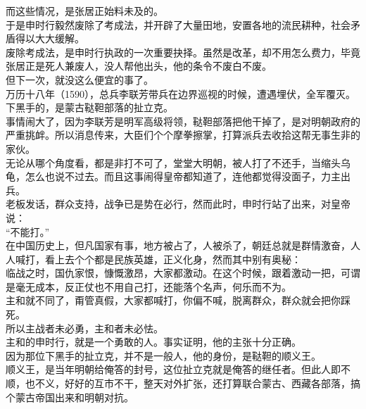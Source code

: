 \begin{multicols}{\theparacolNo}
而这些情况，是张居正始料未及的。\\

于是申时行毅然废除了考成法，并开辟了大量田地，安置各地的流民耕种，社会矛盾得以大大缓解。\\

废除考成法，是申时行执政的一次重要抉择。虽然是改革，却不用怎么费力，毕竟张居正是死人兼废人，没人帮他出头，他的条令不废白不废。\\

但下一次，就没这么便宜的事了。\\

万历十八年（1590），总兵李联芳带兵在边界巡视的时候，遭遇埋伏，全军覆灭。下黑手的，是蒙古鞑靼部落的扯立克。\\

事情闹大了，因为李联芳是明军高级将领，鞑靼部落把他干掉了，是对明朝政府的严重挑衅。所以消息传来，大臣们个个摩拳擦掌，打算派兵去收拾这帮无事生非的家伙。\\

无论从哪个角度看，都是非打不可了，堂堂大明朝，被人打了不还手，当缩头乌龟，怎么也说不过去。而且这事闹得皇帝都知道了，连他都觉得没面子，力主出兵。\\

老板发话，群众支持，战争已是势在必行，然而此时，申时行站了出来，对皇帝说：\\

“不能打。”\\

在中国历史上，但凡国家有事，地方被占了，人被杀了，朝廷总就是群情激奋，人人喊打，看上去个个都是民族英雄，正义化身，然而其中别有奥秘：\\

临战之时，国仇家恨，慷慨激昂，大家都激动。在这个时候，跟着激动一把，可谓是毫无成本，反正仗也不用自己打，还能落个名声，何乐而不为。\\

主和就不同了，甭管真假，大家都喊打，你偏不喊，脱离群众，群众就会把你踩死。\\

所以主战者未必勇，主和者未必怯。\\

主和的申时行，就是一个勇敢的人。事实证明，他的主张十分正确。\\

因为那位下黑手的扯立克，并不是一般人，他的身份，是鞑靼的顺义王。\\

顺义王，是当年明朝给俺答的封号，这位扯立克就是俺答的继任者。但此人即不顺，也不义，好好的互市不干，整天对外扩张，还打算联合蒙古、西藏各部落，搞个蒙古帝国出来和明朝对抗。\\


\end{multicols}
